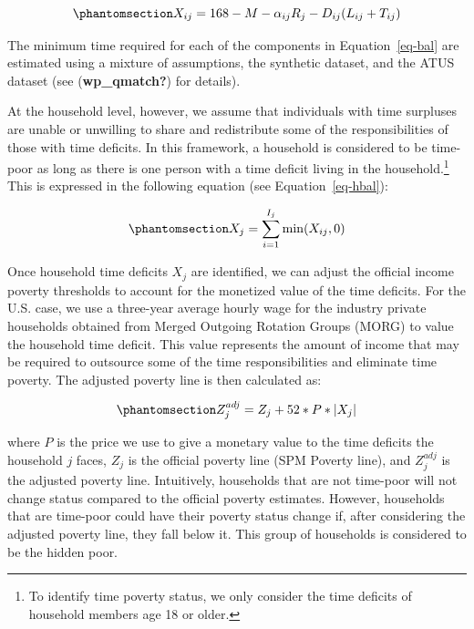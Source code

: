 \documentclass[
  11pt,
]{article}
\begin{document}
\begin{equation}\phantomsection\label{eq-bal}{X_{ij} = 168 - M - \alpha_{ij}R_j-D_{ij}(L_{ij}+T_{ij})
}\end{equation}

The minimum time required for each of the components in
Equation~\ref{eq-bal} are estimated using a mixture of assumptions, the
synthetic dataset, and the ATUS dataset (see (\textbf{wp\_qmatch?}) for
details).

At the household level, however, we assume that individuals with time
surpluses are unable or unwilling to share and redistribute some of the
responsibilities of those with time deficits. In this framework, a
household is considered to be time-poor as long as there is one person
with a time deficit living in the household.\footnote{To identify time
  poverty status, we only consider the time deficits of household
  members age 18 or older.} This is expressed in the following equation
(see Equation~\ref{eq-hbal}):

\begin{equation}\phantomsection\label{eq-hbal}{X_{j} = \sum_{i=1}^{I_j} \min(X_{ij},0)
}\end{equation}

Once household time deficits \(X_{j}\) are identified, we can adjust the
official income poverty thresholds to account for the monetized value of
the time deficits. For the U.S. case, we use a three-year average hourly
wage for the industry private households obtained from Merged Outgoing
Rotation Groups (MORG) to value the household time deficit. This value
represents the amount of income that may be required to outsource some
of the time responsibilities and eliminate time poverty. The adjusted
poverty line is then calculated as:

\begin{equation}\phantomsection\label{eq-limtip}{Z_{j}^{adj} = Z_{j} + 52*P* |X_{j}|
}\end{equation}

where \(P\) is the price we use to give a monetary value to the time
deficits the household \({j}\) faces, \(Z_{j}\) is the official poverty
line (SPM Poverty line), and \(Z_{j}^{adj}\) is the adjusted poverty
line. Intuitively, households that are not time-poor will not change
status compared to the official poverty estimates. However, households
that are time-poor could have their poverty status change if, after
considering the adjusted poverty line, they fall below it. This group of
households is considered to be the hidden poor.
\end{document}
